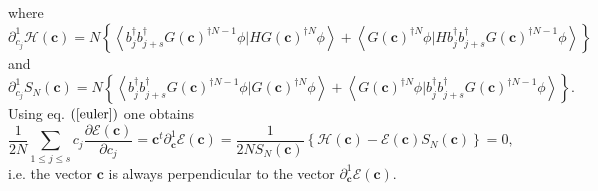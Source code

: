 \documentclass[aps,preprint]{revtex4}%
\begin{document}
where
\begin{equation}
\partial_{c_{j}}^{1}\mathcal{H}\left(  \mathbf{c}\right)  =N\left\{
\left\langle b_{j}^{\dagger}b_{j+s}^{\dagger}G\left(  \mathbf{c}\right)
^{\dagger N-1}\phi|HG\left(  \mathbf{c}\right)  ^{\dagger N}\phi\right\rangle
+\left\langle G\left(  \mathbf{c}\right)  ^{\dagger N}\phi|Hb_{j}^{\dagger
}b_{j+s}^{\dagger}G\left(  \mathbf{c}\right)  ^{\dagger N-1}\phi\right\rangle
\right\}
\end{equation}
and
\begin{equation}
\partial_{c_{j}}^{1}S_{N}\left(  \mathbf{c}\right)  =N\left\{  \left\langle
b_{j}^{\dagger}b_{j+s}^{\dagger}G\left(  \mathbf{c}\right)  ^{\dagger N-1}%
\phi|G\left(  \mathbf{c}\right)  ^{\dagger N}\phi\right\rangle +\left\langle
G\left(  \mathbf{c}\right)  ^{\dagger N}\phi|b_{j}^{\dagger}b_{j+s}^{\dagger
}G\left(  \mathbf{c}\right)  ^{\dagger N-1}\phi\right\rangle \right\}  .
\end{equation}
Using eq. $\left(  \ref{euler}\right)  $ one obtains
\begin{equation}
\frac{1}{2N}\sum_{1\leq j\leq s}c_{j}\frac{\partial\mathcal{E}\left(
\mathbf{c}\right)  }{\partial c_{j}}=\mathbf{c}^{t}\partial_{\mathbf{c}}%
^{1}\mathcal{E}\left(  \mathbf{c}\right)  =\frac{1}{2NS_{N}\left(
\mathbf{c}\right)  }\left\{  \mathcal{H}\left(  \mathbf{c}\right)
-\mathcal{E}\left(  \mathbf{c}\right)  S_{N}\left(  \mathbf{c}\right)
\right\}  =0,
\end{equation}
i.e. the vector $\mathbf{c}$ is always perpendicular to the vector
$\partial_{\mathbf{c}}^{1}\mathcal{E}\left(  \mathbf{c}\right)  $.
\end{document}
